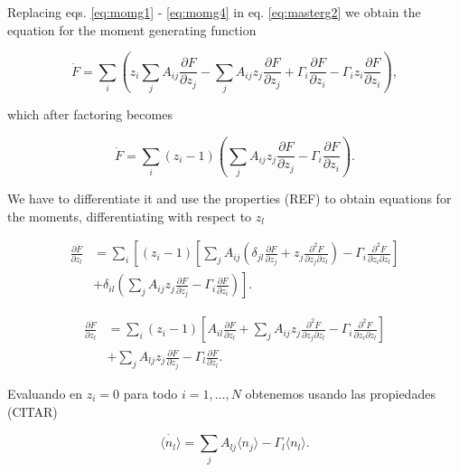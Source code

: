 Replacing eqs. \ref{eq:momg1} - \ref{eq:momg4} in eq. \ref{eq:masterg2} we obtain the equation for the moment generating function

\begin{equation}
\dot{F} = \sum_i\left( z_i\sum_jA_{ij}\frac{\partial F}{\partial z_j} - \sum_jA_{ij} z_j \frac{\partial F}{\partial z_j} + \Gamma_i\frac{\partial F}{\partial z_i} - \Gamma_iz_i\frac{\partial F}{\partial z_i}\right),
\end{equation}

which after factoring becomes

\begin{equation}
\label{eq:momg}
\dot{F} = \sum_i (z_i-1)\left(\sum_jA_{ij} z_j \frac{\partial F}{\partial z_j} - \Gamma_i\frac{\partial F}{\partial z_i}\right).
\end{equation}

We have to differentiate it and use the properties (REF) to obtain equations for the moments, differentiating with respect to $z_l$

\begin{equation}
\begin{split}
\frac{\partial \dot{F}}{\partial z_l} &= \sum_i\left[(z_i-1)\left[\sum_jA_{ij}\left(\delta_{jl}\frac{\partial F}{\partial z_j}+z_j\frac{\partial^2 F}{\partial z_j\partial z_l}\right)-\Gamma_i\frac{\partial^2 F}{\partial z_i\partial z_l}\right]\right.\\
&+\left.\delta_{il}\left(\sum_jA_{ij}z_j\frac{\partial F}{\partial z_j}-\Gamma_i\frac{\partial F}{\partial z_i}\right)\right].
\end{split}
\end{equation}

\begin{equation}
\begin{split}
\frac{\partial \dot{F}}{\partial z_l} &= \sum_i(z_i-1)\left[A_{il}\frac{\partial F}{\partial z_l}+\sum_jA_{ij}z_j\frac{\partial^2 F}{\partial z_j\partial z_l}-\Gamma_i\frac{\partial^2 F}{\partial z_i\partial z_l}\right]\\
&+\sum_jA_{lj}z_j\frac{\partial F}{\partial z_j}-\Gamma_l\frac{\partial F}{\partial z_l}.
\end{split}
\end{equation}

Evaluando en $z_i=0$ para todo $i=1,\dotsc,N$ obtenemos usando las propiedades (CITAR)

\begin{equation}
\dot{\langle n_l \rangle} = \sum_jA_{lj}\langle n_j\rangle-\Gamma_l\langle n_l\rangle.
\end{equation}

